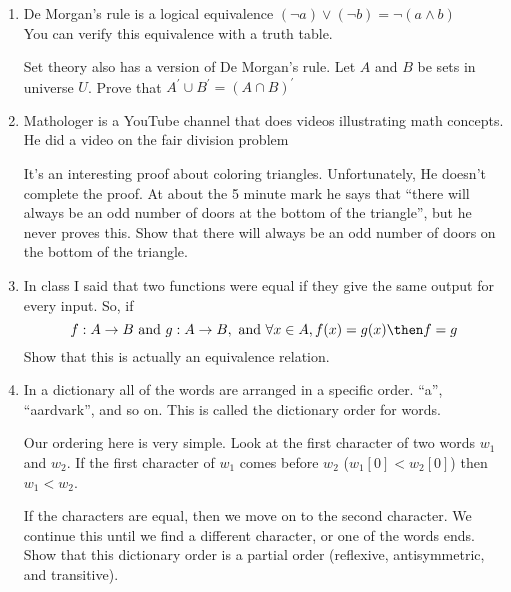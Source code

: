 \documentclass[basic, header]{nosvagor-notes}
\begin{document}
\begin{enumerate}[itemsep=5em]
    \item De Morgan's rule is a logical equivalence $(\lnot a) \lor (\lnot b) =
      \lnot (a \land b)$\\ You can verify this equivalence with a truth table.

      Set theory also has a version of De Morgan's rule. Let $A$ and $B$ be sets
      in universe $U$. Prove that $A^{'} \cup B^{'} = (A \cap B)^{'}$

  \newpage %

    \item Mathologer is a YouTube channel that does videos illustrating math
      concepts. He did a video on the fair division problem
      \begin{center}
      \end{center}

      It's an interesting proof about coloring triangles. Unfortunately, He
      doesn't complete the proof. At about the 5 minute mark he says that
      ``there will always be an odd number of doors at the bottom of the
      triangle'',  but he never proves this. Show that there will always be an
      odd number of doors on the bottom of the triangle.

  \newpage %

    \item In class I said that two functions were equal if they give the same
      output for every input. So, if
      \[f : A \to B ~\text{and}~ g : A \to B, ~\text{and}~ \forall x\in A,
      f(x) = g(x)
      \then f= g
      \]
      Show that this is actually an equivalence relation.

  \newpage %

    \item In a dictionary all of the words are arranged in a specific order.
      ``a'', ``aardvark'', and so on.  This is called the dictionary order for
      words.

      Our ordering here is very simple.  Look at the first character of two
      words $w_1$ and $w_2$.  If the first character of $w_1$ comes before
      $w_2$ ($w_1[0] < w_2[0]$) then $w_1 < w_2$.

      If the characters are equal, then we move on to the second character. We
      continue this until we find a different character, or one of the words
      ends. Show that this dictionary order is a partial order (reflexive,
      antisymmetric, and transitive).

  \end{enumerate}
\end{document}

